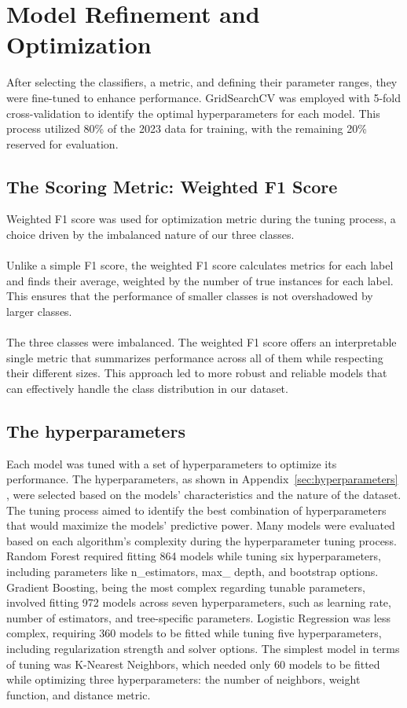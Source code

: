 	\section{Model Refinement and Optimization}

		After selecting the classifiers, a metric, and defining their parameter ranges, they were fine-tuned to enhance
		performance. GridSearchCV was employed with 5-fold cross-validation to identify the optimal hyperparameters for
		each model. This process utilized 80\% of the 2023 data for training, with the remaining 20\%
		reserved for evaluation.

		\subsection{The Scoring Metric: Weighted F1 Score}

			Weighted F1 score was used for optimization metric during the tuning process, a choice driven by the
			imbalanced nature of our three classes.
			\\
			\\
			Unlike a simple F1 score, the weighted F1 score calculates metrics for each label and finds their average,
			weighted by the number of true instances for each label. This ensures that the performance of smaller
			classes is not overshadowed by larger classes.
			\\
			\\
			The three classes were imbalanced. The weighted F1 score offers an interpretable single metric that
			summarizes performance across all of them while respecting their different sizes. This approach led to more
			robust and reliable models that can effectively handle the class distribution in our dataset.

		\subsection{The hyperparameters}

			Each model was tuned with a set of hyperparameters to optimize its performance. The hyperparameters, as
			shown in Appendix~\ref{sec:hyperparameters}
			, were selected based on the models' characteristics and the nature of the dataset. The tuning
			process aimed to identify the best combination of hyperparameters that would maximize the models'
			predictive power.
			Many models were evaluated based on each algorithm's complexity during the hyperparameter tuning
			process.
			Random Forest required fitting 864 models while tuning six hyperparameters, including parameters
			like
			n\_estimators, max\_
			depth, and bootstrap options. Gradient Boosting, being the most complex regarding tunable
			parameters, involved fitting 972 models across seven hyperparameters, such as learning rate, number
			of estimators, and tree-specific parameters. Logistic Regression was less complex, requiring 360
			models to be fitted while tuning five hyperparameters, including regularization strength and solver
			options. The simplest model in terms of tuning was K-Nearest Neighbors, which needed only 60 models
			to be fitted while optimizing three hyperparameters: the number of neighbors, weight function, and
			distance metric.

